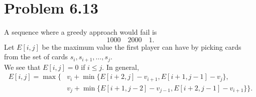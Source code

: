 \documentclass[12pt]{report}
\begin{document}
\section{Problem 6.13}
A sequence where a greedy approach would fail is $$1000 \quad 2000 \quad 1.$$
Let $E[i,j]$ be the maximum value the first player can have by picking cards from the set of cards $s_i, s_{i+1}, \ldots, s_j$. \\
We see that $E[i,j] = 0$ if $i \le j$. In general, $$\begin{aligned} E[i,j] = \max\{ & v_i + \min \{ E[i + 2, j] - v_{i+1}, E[i + 1, j - 1] - v_j \}, \\ & v_j + \min \{ E[i+1,j-2] - v_{j-1}, E[i+2,j-1] - v_{i+1}\}\}. \end{aligned}$$
\end{document}
